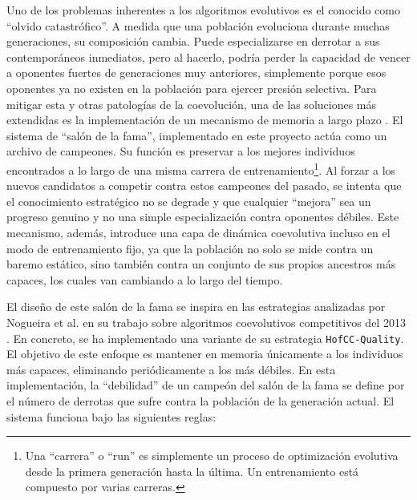 Uno de los problemas inherentes a los algoritmos evolutivos es el conocido como ``olvido catastrófico''. A medida que una población evoluciona durante muchas generaciones, su composición cambia. Puede especializarse en derrotar a sus contemporáneos inmediatos, pero al hacerlo, podría perder la capacidad de vencer a oponentes fuertes de generaciones muy anteriores, simplemente porque esos oponentes ya no existen en la población para ejercer presión selectiva. Para mitigar esta y otras patologías de la coevolución, una de las soluciones más extendidas es la implementación de un mecanismo de memoria a largo plazo \cite{mariela_nogueira_analysis_2013}. El sistema de ``salón de la fama'', implementado en este proyecto actúa como un archivo de campeones. Su función es preservar a los mejores individuos encontrados a lo largo de una misma carrera de entrenamiento\footnote{Una ``carrera'' o ``run'' es simplemente un proceso de optimización evolutiva desde la primera generación hasta la última. Un entrenamiento está compuesto por varias carreras.}. Al forzar a los nuevos candidatos a competir contra estos campeones del pasado, se intenta que el conocimiento estratégico no se degrade y que cualquier ``mejora'' sea un progreso genuino y no una simple especialización contra oponentes débiles. Este mecanismo, además, introduce una capa de dinámica coevolutiva incluso en el modo de entrenamiento fijo, ya que la población no solo se mide contra un baremo estático, sino también contra un conjunto de sus propios ancestros más capaces, los cuales van cambiando a lo largo del tiempo.

El diseño de este salón de la fama se inspira en las estrategias analizadas por Nogueira et al. en su trabajo sobre algoritmos coevolutivos competitivos del 2013 \cite{mariela_nogueira_analysis_2013}. En concreto, se ha implementado una variante de su estrategia \texttt{HofCC-Quality}. El objetivo de este enfoque es mantener en memoria únicamente a los individuos más capaces, eliminando periódicamente a los más débiles. En esta implementación, la ``debilidad'' de un campeón del salón de la fama se define por el número de derrotas que sufre contra la población de la generación actual. El sistema funciona bajo las siguientes reglas:

